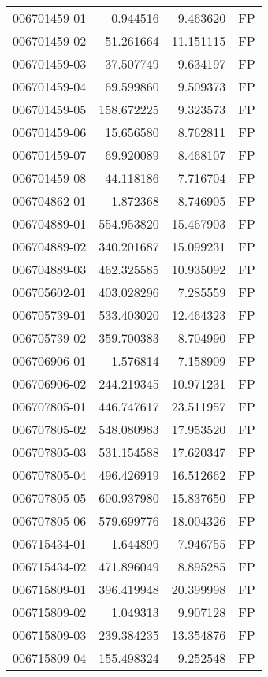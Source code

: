 \begin{tabular}{lrrl}
006701459-01 &    0.944516 &     9.463620 &   FP \\
006701459-02 &   51.261664 &    11.151115 &   FP \\
006701459-03 &   37.507749 &     9.634197 &   FP \\
006701459-04 &   69.599860 &     9.509373 &   FP \\
006701459-05 &  158.672225 &     9.323573 &   FP \\
006701459-06 &   15.656580 &     8.762811 &   FP \\
006701459-07 &   69.920089 &     8.468107 &   FP \\
006701459-08 &   44.118186 &     7.716704 &   FP \\
006704862-01 &    1.872368 &     8.746905 &   FP \\
006704889-01 &  554.953820 &    15.467903 &   FP \\
006704889-02 &  340.201687 &    15.099231 &   FP \\
006704889-03 &  462.325585 &    10.935092 &   FP \\
006705602-01 &  403.028296 &     7.285559 &   FP \\
006705739-01 &  533.403020 &    12.464323 &   FP \\
006705739-02 &  359.700383 &     8.704990 &   FP \\
006706906-01 &    1.576814 &     7.158909 &   FP \\
006706906-02 &  244.219345 &    10.971231 &   FP \\
006707805-01 &  446.747617 &    23.511957 &   FP \\
006707805-02 &  548.080983 &    17.953520 &   FP \\
006707805-03 &  531.154588 &    17.620347 &   FP \\
006707805-04 &  496.426919 &    16.512662 &   FP \\
006707805-05 &  600.937980 &    15.837650 &   FP \\
006707805-06 &  579.699776 &    18.004326 &   FP \\
006715434-01 &    1.644899 &     7.946755 &   FP \\
006715434-02 &  471.896049 &     8.895285 &   FP \\
006715809-01 &  396.419948 &    20.399998 &   FP \\
006715809-02 &    1.049313 &     9.907128 &   FP \\
006715809-03 &  239.384235 &    13.354876 &   FP \\
006715809-04 &  155.498324 &     9.252548 &   FP \\

\end{tabular}
